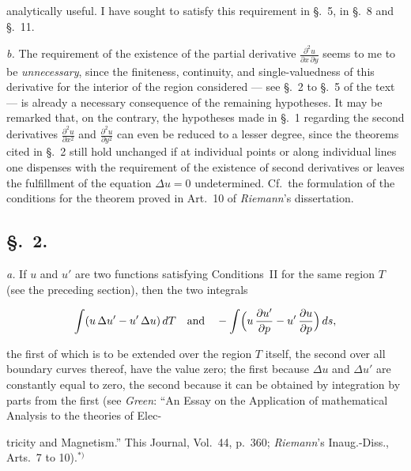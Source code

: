 \documentclass{article}
\begin{document}
analytically useful. I have sought to satisfy this requirement in §.~5, in §.~8 and §.~11.



\emph{b.} The requirement of the existence of the partial derivative $\frac{\partial^2 u}{\partial x\,\partial y}$ seems to me to be \emph{unnecessary}, since the finiteness, continuity, and single-valuedness of this derivative for the interior of the region considered --- see §.~2 to §.~5 of the text --- is already a necessary consequence of the remaining hypotheses. It may be remarked that, on the contrary, the hypotheses made in §.~1 regarding the second derivatives $\frac{\partial^2 u}{\partial x^2}$ and $\frac{\partial^2 u}{\partial y^2}$ can even be reduced to a lesser degree, since the theorems cited in §.~2 still hold unchanged if at individual points or along individual lines one dispenses with the requirement of the existence of second derivatives or leaves the fulfillment of the equation $\Delta u = 0$ undetermined. Cf.~the formulation of the conditions for the theorem proved in Art.~10 of \emph{Riemann}'s dissertation.




\subsection*{§.~2.}



\emph{a.} If $u$ and $u'$ are two functions satisfying Conditions~II for the same region $T$ (see the preceding section), then the two integrals

\[

\int (u\,\Delta u' - u'\,\Delta u)\,dT \quad \text{and} \quad -\int \Bigl(u\,\frac{\partial u'}{\partial p} - u'\,\frac{\partial u}{\partial p}\Bigr)\,ds,

\]

the first of which is to be extended over the region $T$ itself, the second over all boundary curves thereof, have the value zero; the first because $\Delta u$ and $\Delta u'$ are constantly equal to zero, the second because it can be obtained by integration by parts from the first (see \emph{Green}: ``An Essay on the Application of mathematical Analysis to the theories of Elec-



tricity and Magnetism.'' This Journal, Vol.~44, p.~360; \emph{Riemann}'s Inaug.-Diss., Arts.~7 to 10).${}^{*)}$
\end{document}
